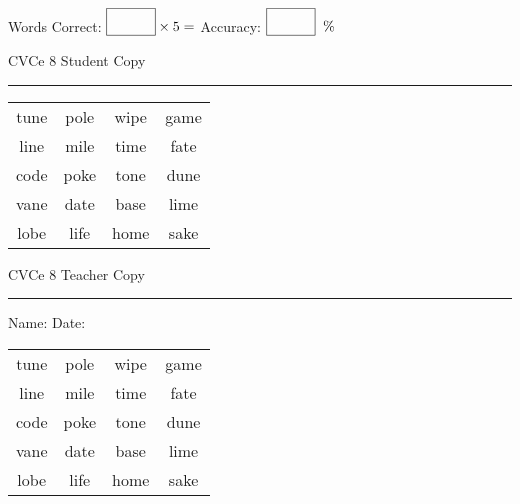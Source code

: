 \documentclass{memoir}
\begin{document}
\small

Words Correct: $\fbox{\phantom{\huge 100}} \times 5 = $ Accuracy: $\fbox{\phantom{\huge 100}}\;\; \%$ 

\vfill

\newpage


\footnotesize \noindent
CVCe 8 \hfill Student Copy
\smallskip
\hrule

\Large

\setlength{\tabcolsep}{14pt}
\def\arraystretch{2}

{\selectfont


\begin{vplace}[0.5]
\begin{center}
\begin{tabular}{cccc}
tune & pole & wipe & game \\
line & mile & time & fate \\
code & poke & tone & dune \\
vane & date & base & lime \\
lobe & life & home & sake \\
\end{tabular}
\end{center}
\end{vplace}

}

\newpage

\footnotesize \noindent
CVCe 8 \hfill Teacher Copy
\smallskip
\hrule

\small

\vfill

\noindent
Name: \underline{\hspace{1.75in}} \hfill Date: \underline{\hspace{1in}}

\Large

{\selectfont


\begin{vplace}[0.5]
\begin{center}
\begin{tabular}{cccc}
tune & pole & wipe & game \\
line & mile & time & fate \\
code & poke & tone & dune \\
vane & date & base & lime \\
lobe & life & home & sake \\
\end{tabular}
\end{center}
\end{vplace}



}
\end{document}
